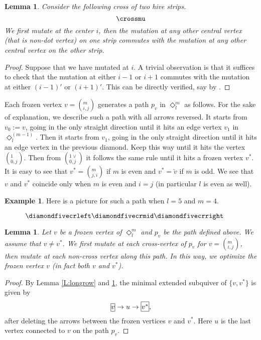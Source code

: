 \documentclass{amsart}
\newtheorem{lemma}[theorem]{Lemma}
\theoremstyle{definition}
\newtheorem{example}[theorem]{Example}
\theoremstyle{remark}
\numberwithin{equation}{section}
\newcommand{\fr}[1]{\framebox[1.2\width]{{${#1}$}}}
\begin{document}
\begin{lemma} \label{L:crosscommu} Consider the following cross of two hive strips.
	$$\crossmu$$
We first mutate at the center $i$, then the mutation at any other central vertex (that is non-dot vertex) on one strip commutes with the mutation at any other central vertex on the other strip.
\end{lemma}

\begin{proof} Suppose that we have mutated at $i$.
A trivial observation is that it suffices to check that the mutation at either $i-1$ or $i+1$ commutes with the mutation at either $(i-1)'$ or $(i+1)'$.
This can be directly verified, say by \cite{Ke}.
\end{proof}
	
	

Each frozen vertex $v=(_{i,j}^m)$ generates a path $p_v$ in ${\Diamond}_l^m$ as follows.
For the sake of explanation, we describe such a path with all arrows reversed.
It starts from $v_0:=v$, going in the only straight direction until it hits an edge vertex $v_1$ in $\Diamond_l^{(m-1)}$.
Then it starts from $v_1$, going in the only straight direction until it hits an edge vertex in the previous diamond.
Keep this way until it hits the vertex $(_{0,j}^1)$.
Then from $(_{0,j}^{{1}\vee})$ it follows the same rule until it hits a frozen vertex $v^*$.
It is easy to see that $v^*=(_{j,i}^m)$ if $m$ is even and $v^*=\check{v}$ if $m$ is odd.
We see that $v$ and $v^*$ coincide only when $m$ is even and $i=j$ (in particular $l$ is even as well).


\begin{example} \label{ex:cross} Here is a picture for such a path when $l=5$ and $m=4$.
\begin{figure}[H] $\diamondfivecrleft \diamondfivecrmid \diamondfivecrright$ \caption{} \label{f:diamond54} \end{figure}
\end{example}


\begin{lemma} \label{L:optfr} Let $v$ be a frozen vertex of $\Diamond_l^m$ and $p_v$ be the path defined above.
We assume that $v\neq v^*$. 
We first mutate at each cross-vertex of $p_v$ for $v=(_{i,j}^m)$, then mutate at each non-cross vertex along this path.
In this way, we optimize the frozen vertex $v$ (in fact both $v$ and $v^*$).
\end{lemma}

\begin{proof} By Lemma \ref{L:longrow} and \ref{L:crosscommu}, the minimal extended subquiver of $\{v,v^*\}$ is given by
	$$\fr{v}\to u \to \fr{v^*},$$
	after deleting the arrows between the frozen vertices $v$ and $v^*$.
	Here $u$ is the last vertex connected to $v$ on the path $p_v$. 
\end{proof}
\end{document}
